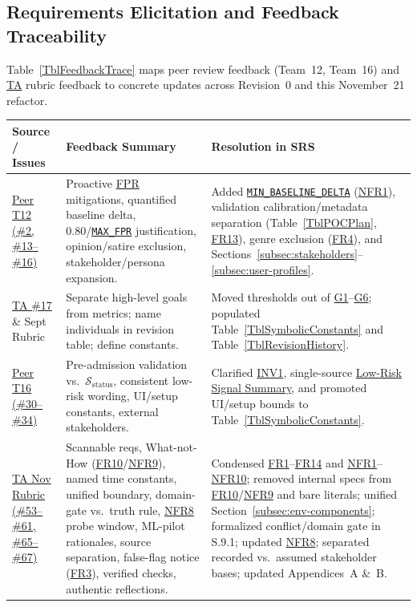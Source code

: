 \documentclass[11pt]{article}
\newcommand{\MaxFPR}{\hyperref[const:MAX_FPR]{\texttt{MAX\_\allowbreak{}FPR}}}
\newcommand{\MinBaselineDelta}{\hyperref[const:MIN_BASELINE_DELTA]{\texttt{MIN\_\allowbreak{}BASELINE\_\allowbreak{}DELTA}}}
\newcommand{\FPR}{\hyperlink{acr-fpr}{FPR}}
\newcommand{\TA}{\hyperlink{acr-ta}{TA}}
\newcommand{\TermLowRisk}{\hyperlink{gls-lowrisk}{Low-Risk Signal Summary}}
\begin{document}
\subsection{Requirements Elicitation and Feedback Traceability}\label{subsec:feedback-trace}

Table~\ref{TblFeedbackTrace} maps peer review feedback (Team~12, Team~16) and \TA{} rubric feedback to concrete updates across Revision~0 and this November~21 refactor.

{\small
\begin{tabularx}{\textwidth}{P{2.8cm} P{3.6cm} Y}
\caption{Peer Review and TA Feedback Traceability} \label{TblFeedbackTrace}\\
\toprule
\textbf{Source / Issues} & \textbf{Feedback Summary} & \textbf{Resolution in SRS}\\
\midrule
\href{https://github.com/richy1337/Verity/issues/2}{Peer T12 (\#2, \#13--\#16)} & Proactive \FPR{} mitigations, quantified baseline delta, 0.80/\MaxFPR{} justification, opinion/satire exclusion, stakeholder/persona expansion. & Added \MinBaselineDelta{} (\hyperref[NFR1]{NFR1}), validation calibration/metadata separation (Table~\ref{TblPOCPlan}, \hyperref[FR13]{FR13}), genre exclusion (\hyperref[FR4]{FR4}), and Sections~\ref{subsec:stakeholders}--\ref{subsec:user-profiles}.\\
\midrule
\href{https://github.com/richy1337/Verity/issues/17}{TA \#17} \& Sept Rubric & Separate high-level goals from metrics; name individuals in revision table; define constants. & Moved thresholds out of \hyperref[G1]{G1}--\hyperref[G6]{G6}; populated Table~\ref{TblSymbolicConstants} and Table~\ref{TblRevisionHistory}.\\
\midrule
\href{https://github.com/richy1337/Verity/issues/30}{Peer T16 (\#30--\#34)} & Pre-admission validation vs.\ $\mathcal{S}_{\text{status}}$, consistent low-risk wording, UI/setup constants, external stakeholders. & Clarified \hyperref[INV1]{INV1}, single-source \TermLowRisk{}, and promoted UI/setup bounds to Table~\ref{TblSymbolicConstants}.\\
\midrule
\href{https://github.com/richy1337/Verity/issues/53}{TA Nov Rubric (\#53--\#61, \#65--\#67)} & Scannable reqs, What-not-How (\hyperref[FR10]{FR10}/\hyperref[NFR9]{NFR9}), named time constants, unified boundary, domain-gate vs.\ truth rule, \hyperref[NFR8]{NFR8} probe window, ML-pilot rationales, source separation, false-flag notice (\hyperref[FR3]{FR3}), verified checks, authentic reflections. & Condensed \hyperref[FR1]{FR1}--\hyperref[FR14]{FR14} and \hyperref[NFR1]{NFR1}--\hyperref[NFR10]{NFR10}; removed internal specs from \hyperref[FR10]{FR10}/\hyperref[NFR9]{NFR9} and bare literals; unified Section~\ref{subsec:env-components}; formalized conflict/domain gate in S.9.1; updated \hyperref[NFR8]{NFR8}; separated recorded vs.\ assumed stakeholder bases; updated Appendices~A \&~B.\\
\end{tabularx}
}
\end{document}
